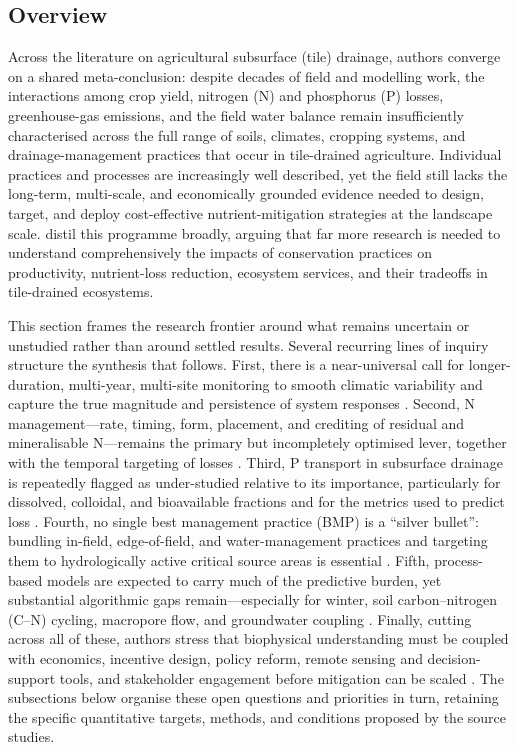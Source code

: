 \subsection{Overview}

Across the literature on agricultural subsurface (tile) drainage, authors converge on a shared meta-conclusion: despite decades of field and modelling work, the interactions among crop yield, nitrogen (N) and phosphorus (P) losses, greenhouse-gas emissions, and the field water balance remain insufficiently characterised across the full range of soils, climates, cropping systems, and drainage-management practices that occur in tile-drained agriculture. Individual practices and processes are increasingly well described, yet the field still lacks the long-term, multi-scale, and economically grounded evidence needed to design, target, and deploy cost-effective nutrient-mitigation strategies at the landscape scale. \textcite{Ma2025} distil this programme broadly, arguing that far more research is needed to understand comprehensively the impacts of conservation practices on productivity, nutrient-loss reduction, ecosystem services, and their tradeoffs in tile-drained ecosystems.

This section frames the research frontier around what remains uncertain or unstudied rather than around settled results. Several recurring lines of inquiry structure the synthesis that follows. First, there is a near-universal call for longer-duration, multi-year, multi-site monitoring to smooth climatic variability and capture the true magnitude and persistence of system responses \parencite{Randall2003,Randall2005,Waring2024,Jeong2018,Cooke2012,Kokulan2019,RANDALL1995}. Second, N management---rate, timing, form, placement, and crediting of residual and mineralisable N---remains the primary but incompletely optimised lever, together with the temporal targeting of losses \parencite{Christianson2015b,Bandura2025,Liu2021,ROSSI1991,Zhao2000}. Third, P transport in subsurface drainage is repeatedly flagged as under-studied relative to its importance, particularly for dissolved, colloidal, and bioavailable fractions and for the metrics used to predict loss \parencite{Hertzberger2019,Yuan2022,deOliveira2022,Sharpley1995,Christianson2016}. Fourth, no single best management practice (BMP) is a ``silver bullet'': bundling in-field, edge-of-field, and water-management practices and targeting them to hydrologically active critical source areas is essential \parencite{Sunohara2016,Lenhart2016,Christianson2014,Baulch2019}. Fifth, process-based models are expected to carry much of the predictive burden, yet substantial algorithmic gaps remain---especially for winter, soil carbon--nitrogen (C--N) cycling, macropore flow, and groundwater coupling \parencite{Du2017,SKAGGS1994,Dietzel2016,Feyereisen2006b}. Finally, cutting across all of these, authors stress that biophysical understanding must be coupled with economics, incentive design, policy reform, remote sensing and decision-support tools, and stakeholder engagement before mitigation can be scaled \parencite{Liu2021,Kvítek2023,David2015,Ferin2023,Khanal2020}. The subsections below organise these open questions and priorities in turn, retaining the specific quantitative targets, methods, and conditions proposed by the source studies.

